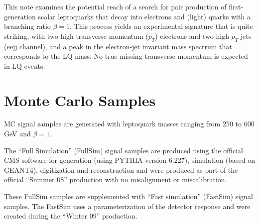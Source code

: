 \documentclass{cmspaper}
\begin{document}
\begin{linenumbers}
This note examines the potential reach of a search for
pair production of first-generation 
scalar leptoquarks that decay into electrons and 
(light) quarks with a branching ratio $\beta=1$. 
This process yields an experimental signature that
is quite striking, with two 
high transverse momentum ($p_T$) electrons 
and two high $p_T$ jets (eejj channel), and
a peak in the electron-jet invariant mass 
spectrum that corresponds to the LQ mass. 
No true missing transverse momentum is expected in LQ events.


\section{Monte Carlo Samples} \label{sec:MCSamples}
MC signal samples are generated with leptoquark masses ranging from 
250 to 600 GeV and $\beta=1$. 

The ``Full Simulation'' (FullSim) signal samples are produced using 
the official CMS software for generation (using PYTHIA version 6.227), 
simulation (based on GEANT4), digitization and reconstruction 
and were produced as part of the official ``Summer 08'' 
production with no misalignment or miscalibration.

These FullSim samples are supplemented with
``Fast simulation'' (FastSim) signal samples. 
The FastSim uses a parameterization of the 
detector response and were created during the ``Winter 09'' production.


\end{linenumbers}
\end{document}
